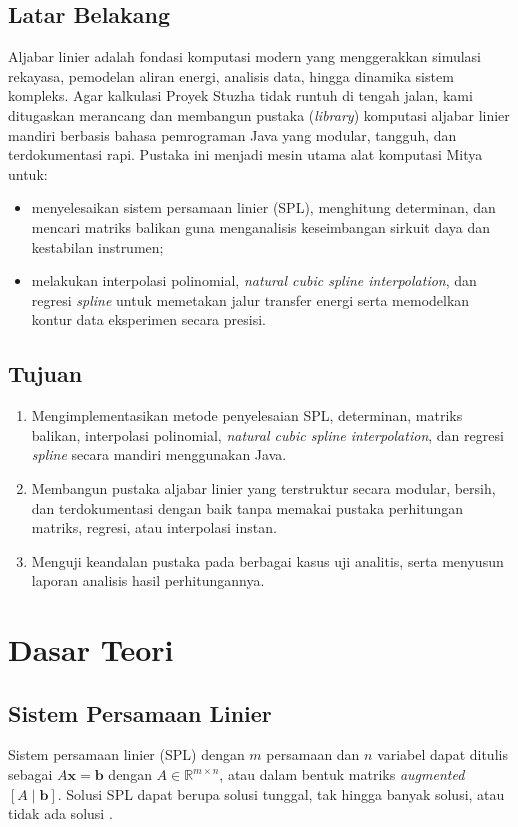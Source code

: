 \documentclass[12pt,a4paper]{article}
\newcommand{\mat}[1]{\mathbf{#1}}
\begin{document}
\subsection{Latar Belakang}
Aljabar linier adalah fondasi komputasi modern yang menggerakkan simulasi rekayasa, pemodelan aliran energi, analisis data, hingga dinamika sistem kompleks. Agar kalkulasi Proyek Stuzha tidak runtuh di tengah jalan, kami ditugaskan merancang dan membangun pustaka (\textit{library}) komputasi aljabar linier mandiri berbasis bahasa pemrograman Java yang modular, tangguh, dan terdokumentasi rapi. Pustaka ini menjadi mesin utama alat komputasi Mitya untuk:
\begin{itemize}
  \item menyelesaikan sistem persamaan linier (SPL), menghitung determinan, dan mencari matriks balikan guna menganalisis keseimbangan sirkuit daya dan kestabilan instrumen;
  \item melakukan interpolasi polinomial, \textit{natural cubic spline interpolation}, dan regresi \textit{spline} untuk memetakan jalur transfer energi serta memodelkan kontur data eksperimen secara presisi.
\end{itemize}

\subsection{Tujuan}
\begin{enumerate}
  \item Mengimplementasikan metode penyelesaian SPL, determinan, matriks balikan, interpolasi polinomial, \textit{natural cubic spline interpolation}, dan regresi \textit{spline} secara mandiri menggunakan Java.
  \item Membangun pustaka aljabar linier yang terstruktur secara modular, bersih, dan terdokumentasi dengan baik tanpa memakai pustaka perhitungan matriks, regresi, atau interpolasi instan.
  \item Menguji keandalan pustaka pada berbagai kasus uji analitis, serta menyusun laporan analisis hasil perhitungannya.
\end{enumerate}

\section{Dasar Teori}

\subsection{Sistem Persamaan Linier}
Sistem persamaan linier (SPL) dengan $m$ persamaan dan $n$ variabel dapat ditulis sebagai $A\mat{x}=\mat{b}$ dengan $A\in\mathbb{R}^{m\times n}$, atau dalam bentuk matriks \textit{augmented} $[A\mid\mat{b}]$. Solusi SPL dapat berupa solusi tunggal, tak hingga banyak solusi, atau tidak ada solusi \cite{anton}.
\end{document}
